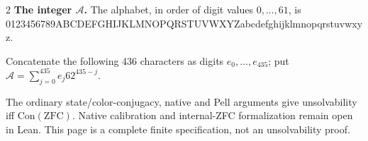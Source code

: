 \documentclass[10pt]{article}
\begin{document}
\begin{multicols}{2}
\textbf{The integer $\mathcal A$.}
The alphabet, in order of digit values $0,\ldots,61$, is
{\fontsize{7.7}{8.2}\selectfont\ttfamily 0123456789ABCDEFGHIJKLMNOPQRSTUVWXYZabcdefghijklmnopqrstuvwxyz}.\par
Concatenate the following 436 characters as digits $e_0,\ldots,e_{435}$;
put $\mathcal A=\sum_{j=0}^{435}e_j62^{435-j}$.\par
\begingroup\fontsize{7.7}{8.2}\selectfont\ttfamily
\endgroup
\normalfont\fontsize{7.7}{8.2}\selectfont
The ordinary state/color-conjugacy, native and Pell arguments give
unsolvability iff $\mathrm{Con}(\mathrm{ZFC})$.
Native calibration and internal-ZFC formalization remain open in Lean.
This page is a complete finite specification, not an unsolvability proof.
\end{multicols}
\end{document}
